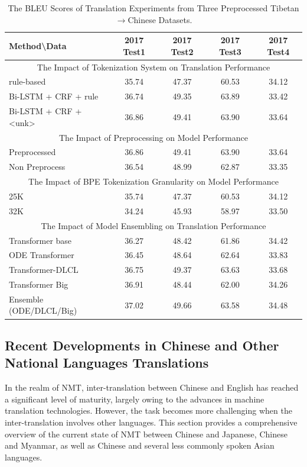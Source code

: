 \documentclass[acmsmall]{acmart}
\begin{document}
\begin{table}[htbp]
\centering
\caption{The BLEU Scores of Translation Experiments from Three Preprocessed Tibetan$\rightarrow$Chinese Datasets.}
\label{Gyatso}
\begin{tabular}{lcccc}
\toprule
Method\textbackslash Data & 2017 Test1 & 2017 Test2 & 2017 Test3 & 2017 Test4 \\
\midrule
\multicolumn{5}{c}{The Impact of Tokenization System on Translation Performance} \\
\midrule
rule-based & 35.74 & 47.37 & 60.53 & 34.12 \\
Bi-LSTM + CRF + rule & 36.74 & 49.35 & 63.89 & 33.42 \\
Bi-LSTM + CRF + <unk> & 36.86 & 49.41 & 63.90 & 33.64 \\
\midrule
\multicolumn{5}{c}{The Impact of Preprocessing on Model Performance} \\
\midrule
Preprocessed & 36.86 & 49.41 & 63.90 & 33.64 \\
Non Preprocess & 36.54 & 48.99 & 62.87 & 33.35 \\
\midrule
\multicolumn{5}{c}{The Impact of BPE Tokenization Granularity on Model Performance} \\
\midrule
25K & 35.74 & 47.37 & 60.53 & 34.12 \\
32K & 34.24 & 45.93 & 58.97 & 33.50 \\
\midrule
\multicolumn{5}{c}{The Impact of Model Ensembling on Translation Performance} \\
\midrule
Transformer base & 36.27 & 48.42 & 61.86 & 34.42 \\
ODE Transformer & 36.45 & 48.64 & 62.64 & 33.83 \\
Transformer-DLCL & 36.75 & 49.37 & 63.63 & 33.68 \\
Transformer Big & 36.91 & 48.44 & 62.00 & 34.26 \\
Ensemble (ODE/DLCL/Big) & 37.02 & 49.66 & 63.58 & 34.48 \\
\bottomrule
\end{tabular}
\end{table}



\subsection{Recent Developments in Chinese and Other National Languages Translations}

In the realm of NMT, inter-translation between Chinese and English has reached a significant level of maturity, largely owing to the advances in machine translation technologies. However, the task becomes more challenging when the inter-translation involves other languages. This section provides a comprehensive overview of the current state of NMT between Chinese and Japanese, Chinese and Myanmar, as well as Chinese and several less commonly spoken Asian languages.
\end{document}
